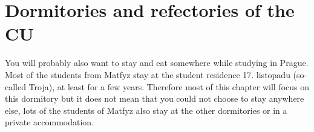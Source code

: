 \section{Dormitories and refectories of the CU}
You will probably also want to stay and eat somewhere while studying in Prague.
Most of the students from Matfyz stay at the student residence 17. listopadu
(so-called Troja), at least for a few years.
Therefore most of this chapter will focus on this dormitory but it does not mean
that you could not choose to stay anywhere else, lots of the students of Matfyz
also stay at the other dormitories or in a private accommodation.